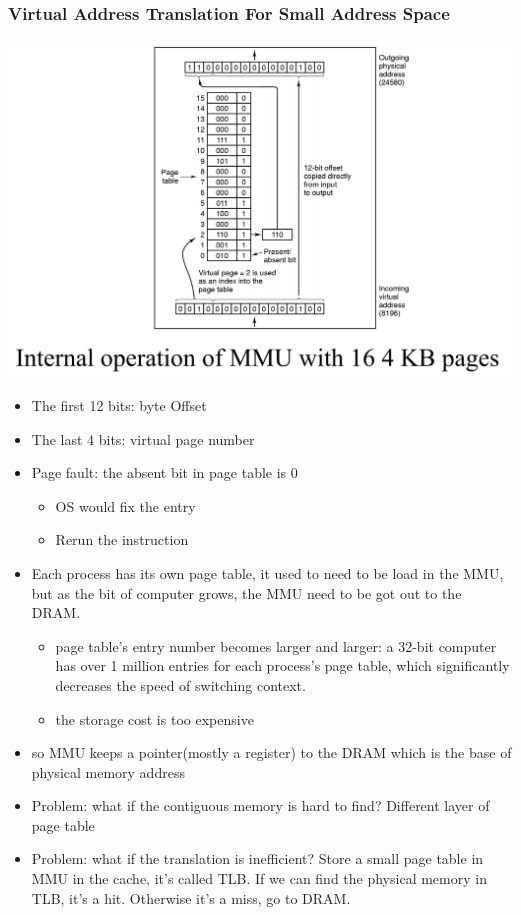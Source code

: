 \documentclass[12pt]{article}
\begin{document}
\subsubsection{Virtual Address Translation For Small Address Space}
\includegraphics[width=\textwidth]{VATranslationExample.png}
\begin{itemize}
    \item The first 12 bits: byte Offset
    \item The last 4 bits: virtual page number
    \item Page fault: the absent bit in page table is 0 \begin{itemize}
        \item OS would fix the entry
        \item Rerun the instruction
    \end{itemize}
    \item Each process has its own page table, it used to need to be load in the MMU, but as the bit of computer grows, the MMU need to be got out to the DRAM. \begin{itemize}
        \item page table's entry number becomes larger and larger: a 32-bit computer has over 1 million entries for each process's page table, which significantly decreases the speed of switching context.
        \item the storage cost is too expensive
    \end{itemize}
    \item so MMU keeps a pointer(mostly a register) to the DRAM which is the base of physical memory address
    \item Problem: what if the contiguous memory is hard to find? Different layer of page table
    \item Problem: what if the translation is inefficient? Store a small page table in MMU in the cache, it's called TLB. If we can find the physical memory in TLB, it's a hit. Otherwise it's a miss, go to DRAM.
\end{itemize}
\end{document}
